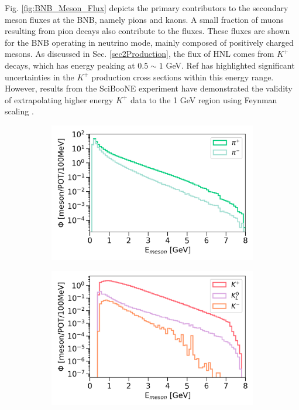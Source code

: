 Fig. \ref{fig:BNB_Meson_Flux} depicts the primary contributors to the secondary meson fluxes at the BNB, namely pions and kaons.
A small fraction of muons resulting from pion decays also contribute to the fluxes.
These fluxes are shown for the BNB operating in neutrino mode, mainly composed of positively charged mesons.
As discussed in Sec. \ref{sec2Production}, the flux of HNL comes from $K^{+}$ decays, which has energy peaking at $0.5 \sim 1$ GeV.
Ref \cite{BNBMiniBooNE} has highlighted significant uncertainties in the $K^{+}$ production cross sections within this energy range.
However, results from the SciBooNE experiment have demonstrated the validity of extrapolating higher energy $K^{+}$ data to the 1 GeV region using Feynman scaling \cite{SciBooNE}. 

\begin{figure}[h!]
\begin{subfigure}{.5\linewidth}
\centering
\includegraphics[width=1.0\textwidth]{BNB_Meson_Pion_Flux}
\end{subfigure}%
\begin{subfigure}{.5\linewidth}
\centering
\includegraphics[width=1.0\textwidth]{BNB_Meson_Kaon_Flux}

\end{subfigure}
\end{figure}
